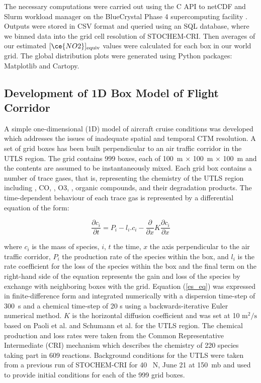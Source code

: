 The necessary computations were carried out using the C API to netCDF and Slurm workload manager on the BlueCrystal Phase 4 supercomputing facility \cite{BC4}. Outputs were stored in CSV format and queried using an SQL database, where we binned data into the grid cell resolution of STOCHEM-CRI. Then averages of our estimated ${[\ce{NO2}]_{\mathrm{equiv}}}$ values were calculated for each box in our world grid. The global distribution plots were generated using Python packages: Matplotlib and Cartopy.

\subsection{Development of 1D Box Model of Flight Corridor}
A simple one-dimensional (1D) model of aircraft cruise conditions was developed which addresses the issues of inadequate spatial and temporal CTM resolution. A set of grid boxes has been built perpendicular to an air traffic corridor in the UTLS region. The grid contains 999 boxes, each of 100~m $\times$ 100~m $\times$ 100~m and the contents are assumed to be instantaneously mixed. Each grid box contains a number of trace gases, that is, representing the chemistry of the UTLS region including , CO, , O3, , organic compounds, and their degradation products. The time-dependent behaviour of each trace gas is represented by a differential equation of the form:

\begin{equation}
	\frac{\partial c_i}{\partial t} = P_i - l_i . c_i - \frac{\partial}{\partial x} K \frac{\partial c_i}{\partial x}
\label{es_eq}
\end{equation}

where $c_i$ is the mass of species, $i$, $t$ the time, $x$ the axis perpendicular to the air traffic corridor, $P_i$ the production rate of the species within the box, and $l_i$ is the rate coefficient for the loss of the species within the box and the final term on the right-hand side of the equation represents the gain and loss of the species by exchange with neighboring boxes with the grid. Equation (\ref{es_eq}) was expressed in finite-difference form and integrated numerically with a dispersion time-step of 300~s and a chemical time-step of 20 s using a backwards-iterative Euler numerical method. $K$ is the horizontal diffusion coefficient and was set at 10 $\mathrm{m}^2/\mathrm{s}$ based on Paoli et al. \cite{Paoli2011} and Schumann et al. \cite{Schumann1995} for the UTLS region. The chemical production and loss rates were taken from the Common Representative Intermediate (CRI) mechanism \cite{Jenkin2008, Watson2008, Utembe2009} which describes the chemistry of 220 species taking part in 609 reactions. Background conditions for the UTLS were taken from a previous run of STOCHEM-CRI for 40 \textdegree~N, June 21 at 150~mb and used to provide initial conditions for each of the 999 grid boxes.
